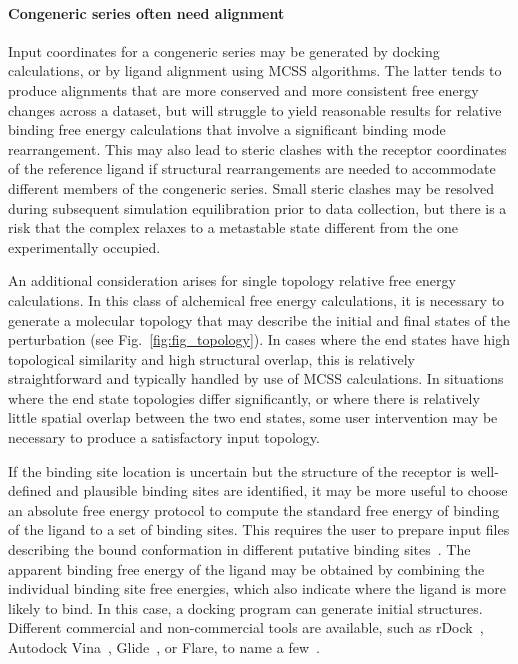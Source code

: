 \documentclass[9pt,bestpractices]{livecoms}
\begin{document}
\paragraph{Congeneric series often need alignment}
Input coordinates for a congeneric series may be generated by docking calculations, or by ligand alignment using MCSS algorithms. The latter tends to produce alignments that are more conserved and more consistent free energy changes across a dataset, but will struggle to yield reasonable results for relative binding free energy calculations that involve a significant binding mode rearrangement. This may also lead to steric clashes with the receptor coordinates of the reference ligand if structural rearrangements are needed to accommodate different members of the congeneric series. Small steric clashes may be resolved during subsequent simulation equilibration prior to data collection, but there is a risk that the complex relaxes to a metastable state different from the one experimentally occupied. 

An additional consideration arises for single topology relative free energy calculations. In this class of alchemical free energy calculations, it is necessary to generate a molecular topology that may describe the initial and final states of the perturbation (see Fig.~\ref{fig:fig_topology}). In cases where the end states have high topological similarity and high structural overlap, this is relatively straightforward and typically handled by use of MCSS calculations. In situations where the end state topologies differ significantly, or where there is relatively little spatial overlap between the two end states, some user intervention may be necessary to produce a satisfactory input topology.

If the binding site location is uncertain but the structure of the receptor is well-defined and plausible binding sites are identified, it may be more useful to choose an absolute free energy protocol to compute the standard free energy of binding of the ligand to a set of binding sites. This requires the user to prepare input files describing the bound conformation in different putative binding sites~\cite{evoli2016multiple}. The apparent binding free energy of the ligand may be obtained by combining the individual binding site free energies, which also indicate where the ligand is more likely to bind. In this case, a docking program can generate initial structures. Different commercial and non-commercial tools are available, such as rDock~\cite{ruiz-carmona2014rdock}, Autodock Vina~\cite{trott2010autodock}, Glide~\cite{friesner2004glide}, or Flare, to name a few~\cite{kuhn2020assessment}. 
\end{document}
